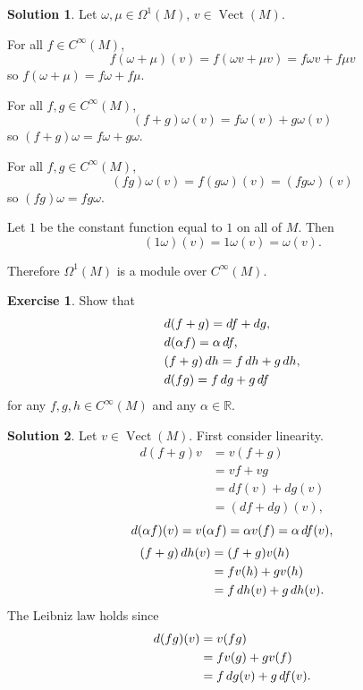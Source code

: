 \documentclass[11pt, a4paper]{report}
\theoremstyle{definition}
\newtheorem{exercise}{Exercise}[part]
\newtheorem{solution}{Solution}[part]
\newenvironment{ex}{\begin{exercise}}{\end{exercise}\pagebreak[1]}
\newenvironment{sol}{\begin{solution}}{\end{solution}\pagebreak[3]}
\newcommand*{\op}[1]{\ensuremath\mathop{}\mathopen{}#1}
\renewcommand*{\d}{\op{d}}
\DeclareMathOperator{\Vect}{Vect}
\begin{document}
\begin{sol}

Let $\omega, \mu \in \Omega^1(M)$, $v\in \Vect(M)$.

For all $f \in C^\infty(M)$,
\[
    f(\omega + \mu)(v) = f(\omega v + \mu v) = f\omega v + f\mu v
\]
so $f(\omega + \mu) = f\omega + f\mu$.

For all $f, g \in C^\infty(M)$,
\[
    (f + g)\omega(v) = f\omega(v) + g\omega(v)
\]
so $(f + g)\omega = f\omega + g\omega$.

For all $f, g \in C^\infty(M)$,
\[
    (fg)\omega(v) = f(g\omega)(v) = (fg\omega)(v)
\]
so $(fg)\omega = fg\omega$.

Let $1$ be the constant function equal to $1$ on all of $M$. Then
\[
    (1\omega)(v) = 1\omega(v) = \omega(v).
\]

Therefore $\Omega^1(M)$ is a module over $C^\infty(M)$.

\end{sol}

\begin{ex}

Show that
\begin{align*}
    & d(f + g) = df + dg, \\
    & d(\alpha f) = \alpha \d f, \\
    & (f + g) \d h = f \d h + g \d h, \\
    & d(fg) = f \d g + g \d f
\end{align*}
for any $f, g, h \in C^\infty(M)$ and any $\alpha \in \mathbb{R}$.

\end{ex}

\begin{sol}

Let $v \in \Vect(M)$. First consider linearity.
\begin{align*}
    d(f + g)v &= v(f + g) \\
              &= vf + vg \\
              &= df(v) + dg(v) \\
              &= (df + dg)(v),
\end{align*}
\[
    d(\alpha f)(v) = v(\alpha f) = \alpha v(f) = \alpha \d f(v),
\]
\begin{align*}
    (f + g) \d h(v) &= (f + g)v(h) \\
                     &= fv(h) + gv(h) \\
                     &= f\d h(v) + g \d h(v).
\end{align*}
The Leibniz law holds since
\begin{align*}
    d(fg)(v) &= v(fg) \\
             &= f v(g) + g v(f) \\
             &= f \d g(v) + g \d f(v).
\end{align*}

\end{sol}
\end{document}
